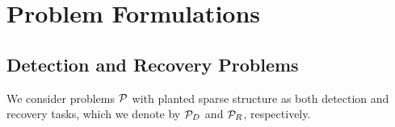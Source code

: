 
\section{Problem Formulations}

\subsection{Detection and Recovery Problems}

We consider problems $\mathcal{P}$ with planted sparse structure as both detection and recovery tasks, which we denote by $\mathcal{P}_D$ and $\mathcal{P}_R$, respectively.


